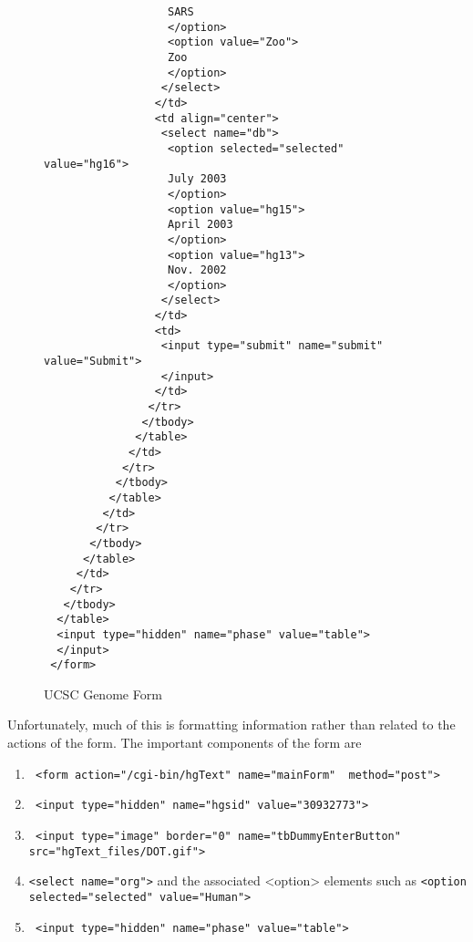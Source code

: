 \documentclass{article}
\def\HTMLTag#1{<#1>}
\begin{document}
\begin{figure}
\begin{center}
\begin{verbatim}
                   SARS
                   </option>
                   <option value="Zoo">
                   Zoo
                   </option>
                  </select>
                 </td>
                 <td align="center">
                  <select name="db">
                   <option selected="selected" value="hg16">
                   July 2003
                   </option>
                   <option value="hg15">
                   April 2003
                   </option>
                   <option value="hg13">
                   Nov. 2002
                   </option>
                  </select>
                 </td>
                 <td>
                  <input type="submit" name="submit" value="Submit">
                  </input>
                 </td>
                </tr>
               </tbody>
              </table>
             </td>
            </tr>
           </tbody>
          </table>
         </td>
        </tr>
       </tbody>
      </table>
     </td>
    </tr>
   </tbody>
  </table>
  <input type="hidden" name="phase" value="table">
  </input>
 </form>
\end{verbatim}
    \caption{UCSC Genome Form}
    \label{fig:ucscform}
  \end{center}
\end{figure}

Unfortunately, much of this is formatting information rather than
related to the actions of the form.
The important components of the form are 
\begin{enumerate}
\item \verb+ <form action="/cgi-bin/hgText" name="mainForm"  method="post">+
\item \verb+ <input type="hidden" name="hgsid" value="30932773">+
\item \verb+ <input type="image" border="0" name="tbDummyEnterButton" src="hgText_files/DOT.gif">+
\item \verb+<select name="org">+ and the associated \HTMLTag{option}
  elements such as \verb+<option selected="selected" value="Human">+
\item \verb+ <input type="hidden" name="phase" value="table">+
\end{enumerate}
\end{document}
